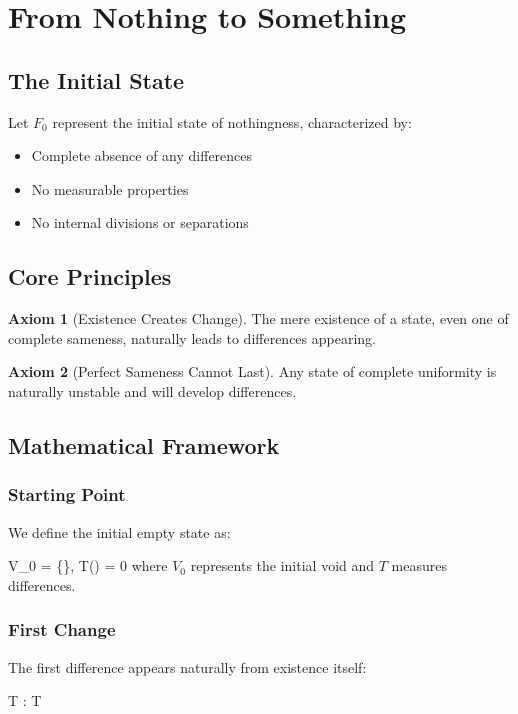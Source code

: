 \documentclass{article}
\let\oldequation\equation
\let\endoldequation\endequation
\renewenvironment{equation}{%
    \noindent\vspace{-\parskip}\vspace{-\baselineskip}%
    \oldequation
}{%
    \endoldequation
    \noindent\vspace{-\parskip}\vspace{-\baselineskip}%
}
\theoremstyle{definition}
\theoremstyle{axiom}
\theoremstyle{theorem}
\theoremstyle{proposition}
\newtheorem{axiom}{Axiom}
\begin{document}
\section{From Nothing to Something}

\subsection{The Initial State}

Let $F_0$ represent the initial state of nothingness, characterized by:
\begin{itemize}
    \item Complete absence of any differences
    \item No measurable properties
    \item No internal divisions or separations
\end{itemize}

\subsection{Core Principles}

\begin{axiom}[Existence Creates Change]
The mere existence of a state, even one of complete sameness, naturally leads to differences appearing.
\end{axiom}

\begin{axiom}[Perfect Sameness Cannot Last]
Any state of complete uniformity is naturally unstable and will develop differences.
\end{axiom}

\subsection{Mathematical Framework}

\subsubsection{Starting Point}
We define the initial empty state as:
\begin{equation}
    V_0 = \{\emptyset\}, \quad T(\emptyset) = 0
\end{equation}
where $V_0$ represents the initial void and $T$ measures differences.

\subsubsection{First Change}
The first difference appears naturally from existence itself:
\begin{equation}
    \exists \Delta T : \Delta T 
\end{equation}
\end{document}
